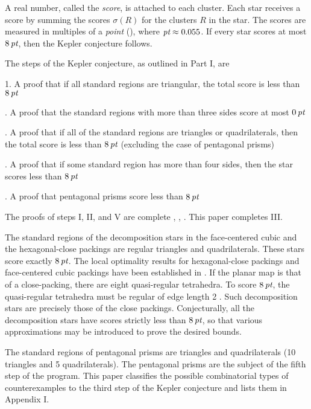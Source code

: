 A real number, called the {\it score},
 is attached to each cluster.  
Each star
receives a score by summing the scores $\sigma(R)$ for the clusters 
$R$ in the
star.   The scores are measured in multiples of a {\it point\/}
(\pt), where
$\hbox{\it pt} \approx 0.055$.  If every star scores at most $8\,\hbox{\it pt}$,
then the Kepler conjecture follows.

The steps of the Kepler conjecture, as outlined in Part I, are

{

\def\ha{ \hangindent=20pt \hangafter=1\relax }
1. A proof that if all standard
regions are triangular, the total score
is less than $8\,\hbox{\it pt}$

\ha
2.  A proof that the standard regions
with more than
three sides
score at most $0\,\hbox{\it pt}$

\ha
3. A proof that if all of the
standard regions are triangles or quadrilaterals,
then the total score is less than $8\,\hbox{\it pt}$ (excluding the
case of pentagonal prisms)


\ha
4.  A proof that if some
standard region has
more than four sides, then the
star scores less than $8\,\hbox{\it pt}$


\ha
5.  A proof that pentagonal prisms score less than $8\,\hbox{\it pt}$

}

The proofs of steps I, II, and V are complete \cite{I}, \cite{II}, \cite{V}.
This paper completes III.

The standard regions of the decomposition
stars in the face-centered cubic and the hexagonal-close packings
are regular
triangles and quadrilaterals.  These stars score exactly
$8\,\hbox{\it pt}$.  The local optimality results for hexagonal-close packings
and face-centered cubic packings have been established in \cite{II}.
If the planar map is that of a close-packing, there are eight quasi-regular
tetrahedra.  To score $8\,\hbox{\it pt}$, the quasi-regular tetrahedra must
be regular of edge length 2 \cite{I.9.1}.  Such decomposition stars
are precisely those of the close packings.  Conjecturally, 
all the decomposition stars have scores strictly less than $8\,\hbox{\it pt}$,
so that various approximations may be introduced to prove the desired
bounds.

The standard regions of pentagonal prisms are
triangles and quadrilaterals (10 triangles and 5
quadrilaterals).  The pentagonal prisms are the subject of
the fifth step of the program.  This paper classifies
the possible combinatorial types of
counterexamples to the third step of the Kepler
conjecture and lists them in Appendix I.

